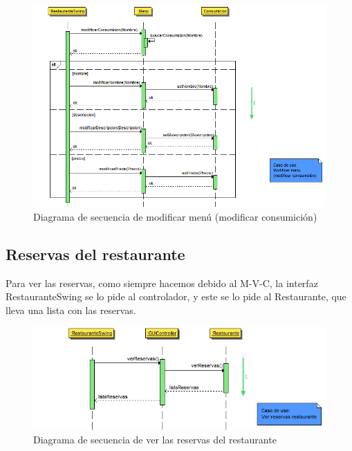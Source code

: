 \documentclass[spanish,a4paper,11pt, twoside]{report}	%
\begin{document}
		\begin{figure}[!h]
		\centering
		\includegraphics[scale=0.5]{DSmodificarconsumicion.png}
		\caption{Diagrama de secuencia de modificar menú (modificar consumición)}
		\end{figure}


		\subsection{Reservas del restaurante}
		Para ver las reservas,  como siempre hacemos debido al M-V-C, la interfaz RestauranteSwing se lo pide al controlador, y este se lo pide al Restaurante, que lleva una lista con las reservas.
		\begin{figure}[!h]
		\centering
		\includegraphics[scale=0.5]{DSverreservas.png}
		\caption{Diagrama de secuencia de ver las reservas del restaurante}
		\end{figure}
\end{document}
